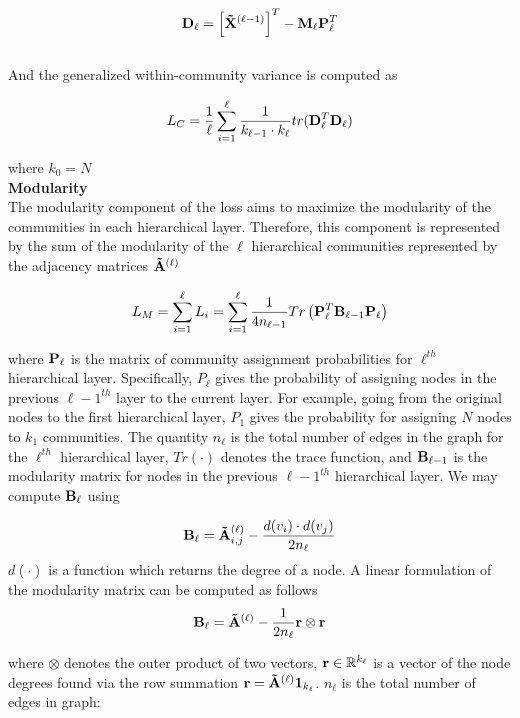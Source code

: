 \documentclass[a4paper,12pt]{article}
\begin{document}
\begin{itemize}
\begin{enumerate}
{{\begin{enumerate}
{					\[ {\bf D}_\ell =\left[{\bf \tilde X}^{(\ell-1)}\right]^T - {\bf M}_\ell{\bf P}_\ell^T \]\\
					
					And the generalized within-community variance is computed as 
					
					\[L_C = \frac{1}{\ell}\sum_{i=1}^\ell \frac{1}{k_{\ell-1}\cdot k_\ell} tr({\bf D}_\ell^T {\bf D}_\ell)\]
					
					where $k_0 = N$ \\
					
					
					\textbf{Modularity}\\
					The modularity component of the loss aims to maximize the modularity of the communities in each hierarchical layer. Therefore, this component is represented by the sum of the modularity of the $\ell$ hierarchical communities represented by the adjacency matrices ${\bf \tilde A}^{(\ell)}$
					
					\[L_M = \sum_{i = 1}^{\ell} L_i =  \sum_{i=1}^\ell \frac{1}{4n_{\ell-1}}Tr\left({\bf P}_\ell^T {\bf B}_{\ell-1} {\bf P}_\ell\right)\]
					
					where ${\bf P}_\ell$ is the matrix of community assignment probabilities for $\ell^{th}$ hierarchical layer. Specifically, ${P}_\ell$ gives the probability of assigning nodes in the previous $\ell -1 ^{th}$ layer to the current layer. For example, going from the original nodes to the first hierarchical layer, ${P}_1$ gives the probability for assigning $N$ nodes to $k_1$ communities. The quantity $n_{\ell}$ is the total number of edges in the graph for the  $\ell^{th}$ hierarchical layer, $Tr(\cdot)$ denotes the trace function, and ${\bf B}_{\ell-1}$ is the modularity matrix for nodes in the previous  $\ell-1^{th}$ hierarchical layer. We may compute ${\bf B}_\ell$ using
					
					\[{\bf B_\ell} = {\bf \tilde A}^{(\ell)}_{i,j} - \frac{d(v_i)\cdot d(v_j)}{2n_\ell}\]
					$d(\cdot)$ is a function which returns the degree of a node. A linear formulation of the modularity matrix can be computed as follows
					\[ {\bf B}_\ell = {\bf \tilde A}^{(\ell)} - \frac{1}{2n_\ell}{\bf r}\otimes{\bf r}\]
					
					where $\otimes$ denotes the outer product of two vectors, ${\bf r}\in\mathbb{R}^{k_\ell}$ is a vector of the node degrees found via the row summation ${\bf r}={\bf \tilde A}^{(\ell)}{\bf 1}_{k_\ell}$. $n_\ell$ is the total number of edges in graph:
					
}
\end{enumerate}}}
\end{enumerate}
\end{itemize}
\end{document}
